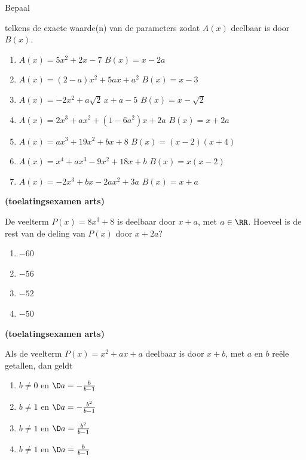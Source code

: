 \documentclass{ximera}
\begin{document}
\begin{Oefening}\setcounter{enumi}{7}  
\hypertarget{oef3.7}{Bepaal} telkens de exacte waarde(n) van de parameters zodat $A(x)$ deelbaar is door $B(x)$. 
\begin{enumerate}

\item
$A(x) = 5x^2+2x-7$ \quad {} \quad $B(x) = x-2a$ 
\item
$A(x) = (2-a)x^2 + 5ax + a^2$ \quad {} \quad $B(x) = x-3$ 
\item
$A(x) = -2x^2 + a\sqrt{2}\,x + a-5$ \quad {} \quad $B(x) = x-\sqrt{2}$ 
\item
$A(x) = 2x^3 + ax^2 + (1-6a^2)x + 2a$ \quad {} \quad $B(x) = x+2a$ 
\item
$A(x) = ax^3 + 19x^2 + bx + 8$ \quad {} \quad $B(x) = (x-2)(x+4)$ 
\item
$A(x) = x^4 + ax^3 - 9x^2 + 18x + b$ \quad {} \quad $B(x) = x(x-2)$ 
\item 
$A(x) = -2x^3 + bx - 2ax^2 + 3a$ \quad {} \quad $B(x) = x+a$ 
\end{enumerate}
\end{Oefening}


\begin{Oefening}\setcounter{enumi}{8} 
\hypertarget{oef3.8}{{\bf (toelatingsexamen arts)}}
De veelterm $P(x) = 8x^3 + 8$ is deelbaar door $x+a$, met $a \in \RR$. Hoeveel is de rest van de deling van $P(x)$ door $x+2a$?
\begin{multicols}{4} 
\begin{enumerate}

\item 
$-60$ 
\item
$-56$ 
\item
$-52$ 
\item 
$-50$ 
\end{enumerate}
\end{multicols}
\end{Oefening}

\begin{Oefening}\setcounter{enumi}{9} 
\hypertarget{oef3.9}{{\bf (toelatingsexamen arts)}}
Als de veelterm $P(x) = x^2 + ax + a$ deelbaar is door $x+b$, met $a$ en $b$ re\"ele getallen, dan geldt
\begin{multicols}{2} 
\begin{enumerate}

\item 
$b \neq 0$ en $\D a = -\frac{b}{b-1}$
\item
$b \neq 1$ en $\D a = -\frac{b^2}{b-1}$
\item
$b \neq 1$ en $\D a = \frac{b^2}{b-1}$
\item
$b \neq 1$ en $\D a = \frac{b}{b-1}$
\end{enumerate}
\end{multicols}
\end{Oefening}
\end{document}
